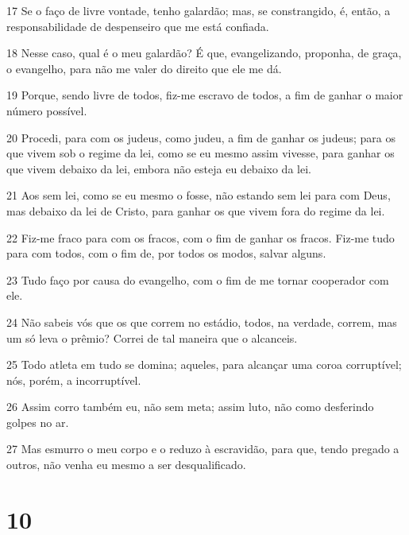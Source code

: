 \par 17 Se o faço de livre vontade, tenho galardão; mas, se constrangido, é, então, a responsabilidade de despenseiro que me está confiada.
\par 18 Nesse caso, qual é o meu galardão? É que, evangelizando, proponha, de graça, o evangelho, para não me valer do direito que ele me dá.
\par 19 Porque, sendo livre de todos, fiz-me escravo de todos, a fim de ganhar o maior número possível.
\par 20 Procedi, para com os judeus, como judeu, a fim de ganhar os judeus; para os que vivem sob o regime da lei, como se eu mesmo assim vivesse, para ganhar os que vivem debaixo da lei, embora não esteja eu debaixo da lei.
\par 21 Aos sem lei, como se eu mesmo o fosse, não estando sem lei para com Deus, mas debaixo da lei de Cristo, para ganhar os que vivem fora do regime da lei.
\par 22 Fiz-me fraco para com os fracos, com o fim de ganhar os fracos. Fiz-me tudo para com todos, com o fim de, por todos os modos, salvar alguns.
\par 23 Tudo faço por causa do evangelho, com o fim de me tornar cooperador com ele.
\par 24 Não sabeis vós que os que correm no estádio, todos, na verdade, correm, mas um só leva o prêmio? Correi de tal maneira que o alcanceis.
\par 25 Todo atleta em tudo se domina; aqueles, para alcançar uma coroa corruptível; nós, porém, a incorruptível.
\par 26 Assim corro também eu, não sem meta; assim luto, não como desferindo golpes no ar.
\par 27 Mas esmurro o meu corpo e o reduzo à escravidão, para que, tendo pregado a outros, não venha eu mesmo a ser desqualificado.

\chapter{10}

